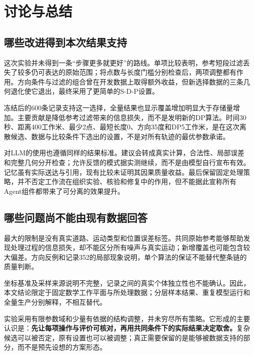 \section{讨论与总结}

\subsection{哪些改进得到本次结果支持}
这次实验并未得到一条“步骤更多就更好”的路线。单项比较表明，参考短段过滤丢失了较多仍可表达的原始范围；将点数与长度门槛分别检查后，两项调整都有作用。方向条件与过滤的组合曾在开发数据上取得额外收益，但新选择数据的三条几何退化使它退出，最终采用了更简单的S-D-P设置。

冻结后的600条记录支持这一选择，全量结果也显示覆盖增加明显大于存储量增加。主要贡献是降低参考过滤带来的信息损失，而不是发明新的DP算法。时间30秒、距离400工作米、最少2点、最短长度0、方向35度和DP5工作米，是在这次离散候选、数据与比较条件下选出的设置，不是对所有轨迹的最优参数承诺。

对LLM的使用也遵循同样的结果标准。建议会转成真实计算，合法性、局部误差和完整几何分开检查；允许反馈的模式据实测继续，而不是由模型自行宣布有效。记忆虽有实际送达与引用，现有比较未证明其因果质量收益。最后保留固定处理策略，并不否定工作流在组织实验、核验和修复中的作用，但不能据此宣称所有Agent组件都带来了可分离的效果提升。

\subsection{哪些问题尚不能由现有数据回答}
最大的限制是没有真实道路、运动类型和位置误差标签。共同原始参考能够帮助发现处理过程的信息损失，却不能区分所有噪声与真实运动；新增覆盖也可能包含较大偏差。方向反例和记录352的局部现象说明，单个算法的保证不能替代整条链的质量判断。

坐标基准及采样来源说明不完整，记录之间的真实个体独立性也不能确认。因此，本文结论限定于固定数学工作平面与所处理数据；分层样本结果、重复模型运行和全量生产分别解释，不相互替代。

实验采用有限参数域和少量有依据的结构调整，并未穷尽所有策略。它形成的主要认识是：\textbf{先让每项操作与评价可核对，再用共同条件下的实际结果决定取舍。}复杂候选可以被否定，原有设置也可以被调整；真正需要保留的是能够被数据支持的部分，而不是预先设想的方案形态。
